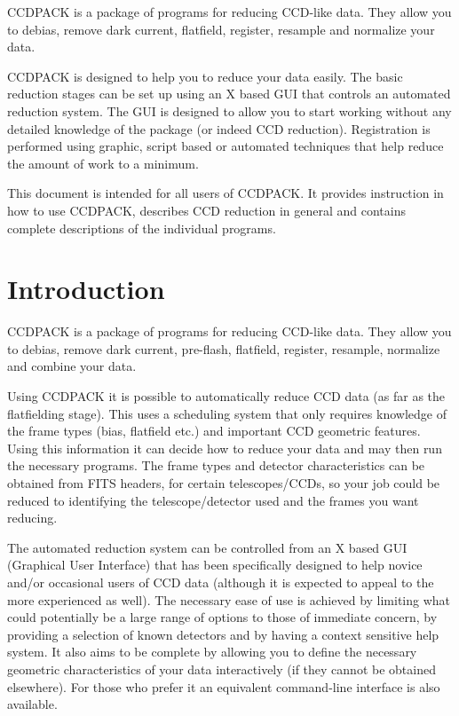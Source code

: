 \documentclass[twoside,11pt]{article}
\newcommand{\stardocinitials}  {SUN}
\newcommand{\stardocnumber}    {139.14}
\newcommand{\stardocabstract}  {
CCDPACK is a package of programs for reducing CCD-like data. They
allow you to debias, remove dark current, flatfield, register,
resample and normalize your data.

CCDPACK is designed to help you to reduce your data easily.
The basic reduction stages can be set up using an X based GUI that
controls an automated reduction system.
The GUI is designed to allow you to start working without any
detailed knowledge of the package (or indeed CCD reduction).
Registration is performed using graphic, script based or automated
techniques that help reduce the amount of work to a minimum.

This document is intended for all users of CCDPACK.
It provides instruction in how to use CCDPACK, describes CCD reduction
in general and contains complete descriptions of the individual
programs.
}
\newcommand{\stardocname}{\stardocinitials /\stardocnumber}
\newenvironment{latexonly}{}{}
\newcommand{\xlabel}[1]{}
\renewcommand{\_}{\texttt{\symbol{95}}}
\renewcommand{\thepage}{\roman{page}}
\begin{document}
\stardocabstract
  \newpage
  \begin{latexonly}
    \setlength{\parskip}{0mm}
    \tableofcontents
    \setlength{\parskip}{\medskipamount}
    \markboth{\stardocname}{\stardocname}
  \end{latexonly}
\cleardoublepage
\renewcommand{\thepage}{\arabic{page}}
\setcounter{page}{1}

\section{\xlabel{introduction}Introduction}

CCDPACK is a package of programs for reducing CCD-like data. They
allow you to debias, remove dark current, pre-flash, flatfield,
register, resample, normalize and combine your data.

Using CCDPACK it is possible to automatically reduce CCD data (as far
as the flatfielding stage). This uses a scheduling system that only
requires knowledge of the frame types (bias, flatfield etc.) and
important CCD geometric features.
Using this information it can decide how to reduce your data and may
then run the necessary programs.
The frame types and detector characteristics can be obtained from FITS
headers, for certain telescopes/CCDs, so your job could be reduced to
identifying the telescope/detector used and the frames you want
reducing.

The automated reduction system can be controlled from an X based GUI
(Graphical User Interface) that has been specifically designed to
help novice and/or occasional users of CCD data (although it is
expected to appeal to the more experienced as well).
The necessary ease of use is achieved by limiting what could
potentially be a large range of options to those of immediate concern,
by providing a selection of known detectors and by having a context
sensitive help system.
It also aims to be complete by allowing you to define the necessary
geometric characteristics of your data interactively (if they cannot
be obtained elsewhere).
For those who prefer it an equivalent command-line interface is also
available.
\end{document}
